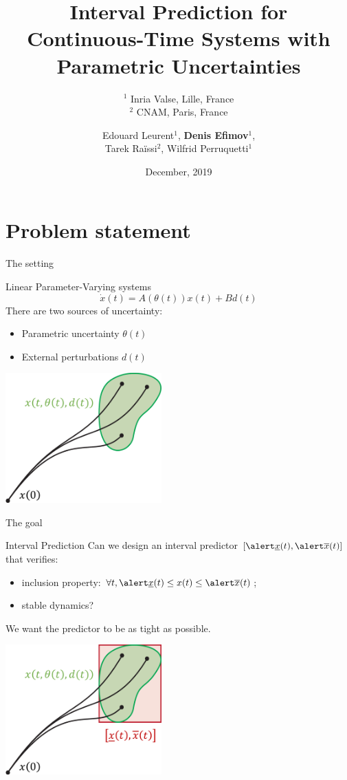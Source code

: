 \documentclass[slideopt,A4,showboxes,svgnames]{beamer}
\title[Interval Prediction with Parametric Uncertainties]{Interval Prediction for \\ Continuous-Time Systems with \\ Parametric Uncertainties}
\subtitle{$^1$ Inria Valse, Lille, France\\
$^2$ CNAM, Paris, France}
\date[December, 2019]{December, 2019}
\author[Denis Efimov]{Edouard Leurent$^1$, \textbf{Denis Efimov}$^1$, \\Tarek Ra\"issi$^2$, Wilfrid Perruquetti$^1$}
\begin{document}
\begin{frame}
    \titlepage
\end{frame}

\frame{\tocpage}
 
\section{Problem statement}

\frame{\sectionpage}

\begin{frame}{The setting}
\begin{block}{Linear Parameter-Varying systems}
	\begin{equation*}
	\dot{x}(t)=A(\theta(t))x(t)+Bd(t)\label{eq:LPV_syst}
	\end{equation*}
	There are two sources of uncertainty:
	\begin{itemize}
		\item Parametric uncertainty $\theta(t)$
		\item External perturbations $d(t)$
	\end{itemize}
\end{block}

\centering
\includegraphics[width=0.45\textwidth]{img/interval-hull-0}
\end{frame}

\begin{frame}{The goal}
\begin{block}{Interval Prediction}
	Can we design an interval predictor $[\ux, \ox]$ that verifies:
	\begin{itemize}
		\item inclusion property: $\forall t, \ux \leq x(t) \leq \ox$;
		\item stable dynamics?
	\end{itemize}
	We want the predictor to be as tight as possible.
\end{block}

\centering
\includegraphics[width=0.45\textwidth]{img/interval-hull}
\end{frame}
\end{document}
